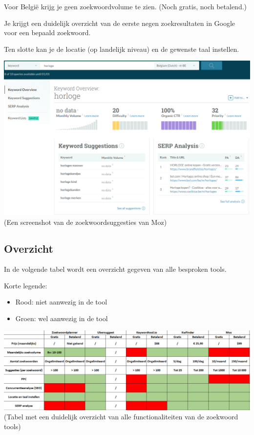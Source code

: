 Voor België krijg je geen zoekwoordvolume te zien. (Noch gratis, noch betalend.)

Je krijgt een duidelijk overzicht van de eerste negen zoekresultaten in Google voor een bepaald zoekwoord. 

Ten slotte kan je de locatie (op landelijk niveau) en de gewenste taal instellen.

\includegraphics[width=\linewidth]{Bachelorproef/bachelor/img/moz.PNG}
(Een screenshot van de zoekwoordsuggesties van Moz)

\subsection{Overzicht}
\label{ch: Overzicht}

In de volgende tabel wordt een overzicht gegeven van alle besproken tools. 

Korte legende: 
\begin{itemize}
\item Rood: niet aanwezig in de tool
\item Groen: wel aanwezig in de tool
\end{itemize}

\includegraphics[width=\linewidth]{Bachelorproef/bachelor/img/zoekwoordtabel.PNG}
(Tabel met een duidelijk overzicht van alle functionaliteiten van de zoekwoord tools)

